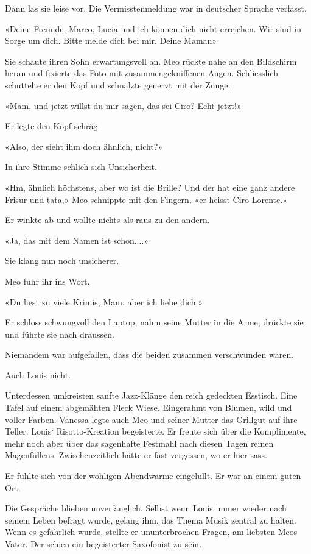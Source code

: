 Dann las sie leise vor. Die Vermisstenmeldung war in deutscher Sprache
verfasst.

«Deine Freunde, Marco, Lucia und ich können dich nicht erreichen. Wir
sind in Sorge um dich. Bitte melde dich bei mir. Deine Maman»

Sie schaute ihren Sohn erwartungsvoll an. Meo rückte nahe an den
Bildschirm heran und fixierte das Foto mit zusammengekniffenen Augen.
Schliesslich schüttelte er den Kopf und schnalzte genervt mit der Zunge.

«Mam, und jetzt willst du mir sagen, das sei Ciro? Echt jetzt!»

Er legte den Kopf schräg.

«Also, der sieht ihm doch ähnlich, nicht?»

In ihre Stimme schlich sich Unsicherheit.

«Hm, ähnlich höchstens, aber wo ist die Brille? Und der hat eine ganz
andere Frisur und tata,» Meo schnippte mit den Fingern, «er heisst Ciro
Lorente.»

Er winkte ab und wollte nichts als raus zu den andern.

«Ja, das mit dem Namen ist schon....»

Sie klang nun noch unsicherer.

Meo fuhr ihr ins Wort.

«Du liest zu viele Krimis, Mam, aber ich liebe dich.»

Er schloss schwungvoll den Laptop, nahm seine Mutter in die Arme,
drückte sie und führte sie nach draussen.

Niemandem war aufgefallen, dass die beiden zusammen verschwunden waren.

Auch Louis nicht.

Unterdessen umkreisten sanfte Jazz-Klänge den reich gedeckten Esstisch.
Eine Tafel auf einem abgemähten Fleck Wiese. Eingerahmt von Blumen, wild
und voller Farben. Vanessa legte auch Meo und seiner Mutter das Grillgut
auf ihre Teller. Louis` Risotto-Kreation begeisterte. Er freute sich
über die Komplimente, mehr noch aber über das sagenhafte Festmahl nach
diesen Tagen reinen Magenfüllens. Zwischenzeitlich hätte er fast
vergessen, wo er hier sass.

Er fühlte sich von der wohligen Abendwärme eingelullt. Er war an einem
guten Ort.

Die Gespräche blieben unverfänglich. Selbst wenn Louis immer wieder nach
seinem Leben befragt wurde, gelang ihm, das Thema Musik zentral zu
halten. Wenn es gefährlich wurde, stellte er ununterbrochen Fragen, am
liebsten Meos Vater. Der schien ein begeisterter Saxofonist zu sein.

